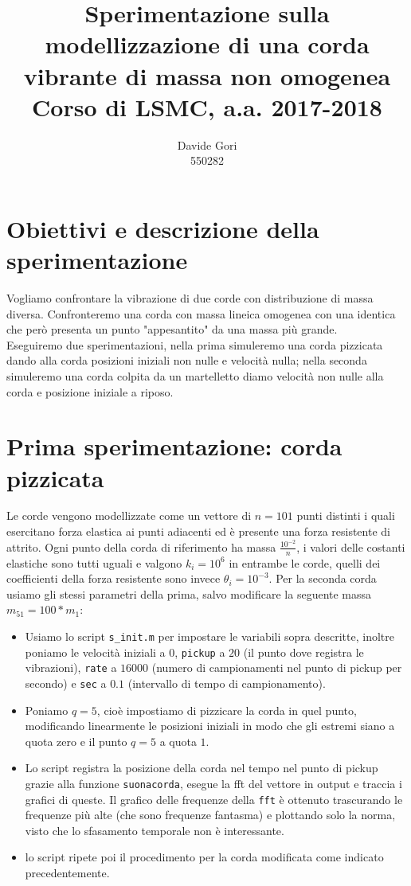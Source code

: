 \documentclass{article}
\title{Sperimentazione sulla modellizzazione di una corda vibrante di massa non omogenea\\
	Corso di LSMC, a.a. 2017-2018}
\author{Davide Gori\\
	550282}
\begin{document}
	\maketitle
	\section{Obiettivi e descrizione della sperimentazione}
	Vogliamo confrontare la vibrazione di due corde con distribuzione di massa diversa. Confronteremo una corda con massa lineica omogenea con una identica che però presenta un punto "appesantito" da una massa più grande.\\
	Eseguiremo due sperimentazioni, nella prima simuleremo una corda pizzicata dando alla corda posizioni iniziali non nulle e velocità nulla; nella seconda simuleremo una corda colpita da un martelletto diamo velocità non nulle alla corda e posizione iniziale a riposo.

	\section{Prima sperimentazione: corda pizzicata}
	Le corde vengono modellizzate come un vettore di $n=101$ punti distinti i quali esercitano forza elastica ai punti adiacenti ed è presente una forza resistente di attrito. Ogni punto della corda di riferimento ha massa $\frac{10^{-2}}{n}$, i valori delle costanti elastiche sono tutti uguali e valgono $k_i=10^6$ in entrambe le corde, quelli dei coefficienti della forza resistente sono invece $\theta_i=10^{-3}$. Per la seconda corda usiamo gli stessi parametri della prima, salvo modificare la seguente massa $m_51=100*m_1$:\\
	\begin{itemize}
		\item Usiamo lo script {\tt s\_init.m} per impostare le variabili sopra descritte, inoltre poniamo le velocità iniziali a $0$, {\tt pickup} a $20$ (il punto dove registra le vibrazioni), {\tt rate} a $16000$ (numero di campionamenti nel punto di pickup per secondo) e {\tt sec} a $0.1$ (intervallo di tempo di campionamento).
		\item Poniamo $q=5$, cioè impostiamo di pizzicare la corda in quel punto, modificando linearmente le posizioni iniziali in modo che gli estremi siano a quota zero e il punto $q=5$ a quota $1$.
		\item Lo script registra la posizione della corda nel tempo nel punto di pickup grazie alla funzione {\tt suonacorda}, esegue la fft del vettore in output e traccia i grafici di queste. Il grafico delle frequenze della {\tt fft} è ottenuto trascurando le frequenze più alte (che sono frequenze fantasma) e plottando solo la norma, visto che lo sfasamento temporale non è interessante.  
		\item lo script ripete poi il procedimento per la corda modificata come indicato precedentemente.
	\end{itemize}
	
\end{document}
